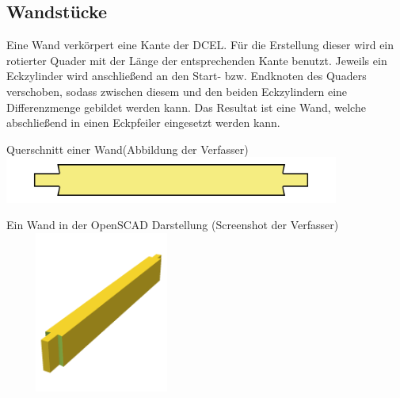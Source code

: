 \subsection{Wandstücke}
Eine Wand verkörpert eine Kante der DCEL.
Für die Erstellung dieser wird ein rotierter Quader mit der Länge der entsprechenden Kante benutzt.
Jeweils ein Eckzylinder wird anschließend an den Start- bzw. Endknoten des Quaders verschoben, sodass zwischen diesem und den beiden Eckzylindern eine Differenzmenge gebildet werden kann.
Das Resultat ist eine Wand, welche abschließend in einen Eckpfeiler eingesetzt werden kann. 
\begin{Bild}{Querschnitt einer Wand(Abbildung der Verfasser)}
	\includegraphics[width = 110mm]{Bilder/Wand2D-04}
\end{Bild}
\begin{Bild}{Ein Wand in der OpenSCAD Darstellung (Screenshot der Verfasser)}
	\includegraphics[height=200px, width=240px]{Bilder/Untereinheit_Wand}
\end{Bild}

